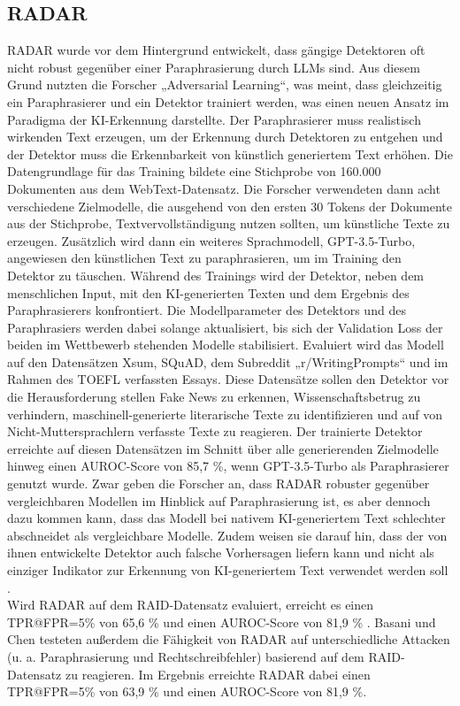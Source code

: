 \subsection{RADAR}
\label{subsec:radar}
RADAR wurde vor dem Hintergrund entwickelt, dass gängige Detektoren oft nicht robust gegenüber einer Paraphrasierung durch LLMs sind. Aus diesem Grund nutzten die Forscher „Adversarial Learning“, was meint, dass gleichzeitig ein Paraphrasierer und ein Detektor trainiert werden, was einen neuen Ansatz im Paradigma der KI-Erkennung darstellte. Der Paraphrasierer muss realistisch wirkenden Text erzeugen, um der Erkennung durch Detektoren zu entgehen und der Detektor muss die Erkennbarkeit von künstlich generiertem Text erhöhen. Die Datengrundlage für das Training bildete eine Stichprobe von 160.000 Dokumenten aus dem WebText-Datensatz. Die Forscher verwendeten dann acht verschiedene Zielmodelle, die ausgehend von den ersten 30 Tokens der Dokumente aus der Stichprobe, Textvervollständigung nutzen sollten, um künstliche Texte zu erzeugen. Zusätzlich wird dann ein weiteres Sprachmodell, GPT-3.5-Turbo, angewiesen den künstlichen Text zu paraphrasieren, um im Training den Detektor zu täuschen. Während des Trainings wird der Detektor, neben dem menschlichen Input, mit den KI-generierten Texten und dem Ergebnis des Paraphrasierers konfrontiert. Die Modellparameter des Detektors und des Paraphrasiers werden dabei solange aktualisiert, bis sich der Validation Loss der beiden im Wettbewerb stehenden Modelle stabilisiert. Evaluiert wird das Modell auf den Datensätzen Xsum, SQuAD, dem Subreddit „r/WritingPrompts“ und im Rahmen des TOEFL verfassten Essays. Diese Datensätze sollen den Detektor vor die Herausforderung stellen Fake News zu erkennen, Wissenschaftsbetrug zu verhindern, maschinell-generierte literarische Texte zu identifizieren und auf von Nicht-Muttersprachlern verfasste Texte zu reagieren. Der trainierte Detektor erreichte auf diesen Datensätzen im Schnitt über alle generierenden Zielmodelle hinweg einen AUROC-Score von 85,7 \%, wenn GPT-3.5-Turbo als Paraphrasierer genutzt wurde. Zwar geben die Forscher an, dass RADAR robuster gegenüber vergleichbaren Modellen im Hinblick auf Paraphrasierung ist, es aber dennoch dazu kommen kann, dass das Modell bei nativem KI-generiertem Text schlechter abschneidet als vergleichbare Modelle. Zudem weisen sie darauf hin, dass der von ihnen entwickelte Detektor auch falsche Vorhersagen liefern kann und nicht als einziger Indikator zur Erkennung von KI-generiertem Text verwendet werden soll \autocite{hu2023radar}.\\
Wird RADAR auf dem RAID-Datensatz evaluiert, erreicht es einen TPR@FPR=5\% von 65,6 \% und einen AUROC-Score von 81,9 \% \autocite{basani2026diversityboostsaigeneratedtext}. Basani und Chen \autocite{basani2026diversityboostsaigeneratedtext} testeten außerdem die Fähigkeit von RADAR auf unterschiedliche Attacken (u. a. Paraphrasierung und Rechtschreibfehler) basierend auf dem RAID-Datensatz zu reagieren. Im Ergebnis erreichte RADAR dabei einen TPR@FPR=5\% von 63,9 \% und einen AUROC-Score von 81,9 \%.

